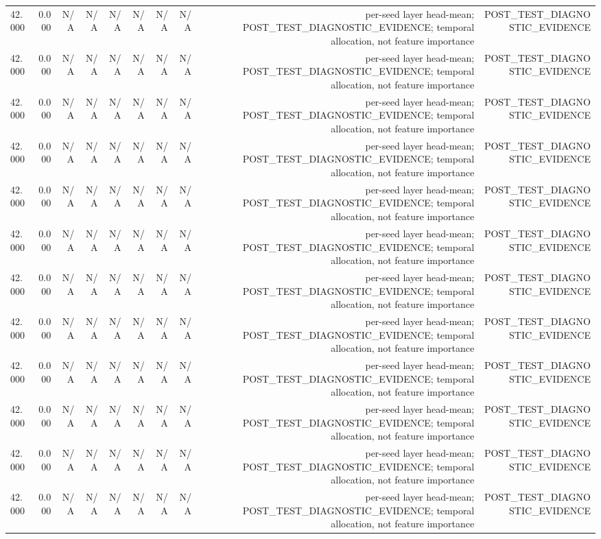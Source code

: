 \begin{table}[h!]
\begin{tabular}{lrrrrrrrrr}
42.000 & 0.000 & N/A & N/A & N/A & N/A & N/A & N/A & per-seed layer head-mean; POST\_TEST\_DIAGNOSTIC\_EVIDENCE; temporal allocation, not feature importance & POST\_TEST\_DIAGNOSTIC\_EVIDENCE \\
42.000 & 0.000 & N/A & N/A & N/A & N/A & N/A & N/A & per-seed layer head-mean; POST\_TEST\_DIAGNOSTIC\_EVIDENCE; temporal allocation, not feature importance & POST\_TEST\_DIAGNOSTIC\_EVIDENCE \\
42.000 & 0.000 & N/A & N/A & N/A & N/A & N/A & N/A & per-seed layer head-mean; POST\_TEST\_DIAGNOSTIC\_EVIDENCE; temporal allocation, not feature importance & POST\_TEST\_DIAGNOSTIC\_EVIDENCE \\
42.000 & 0.000 & N/A & N/A & N/A & N/A & N/A & N/A & per-seed layer head-mean; POST\_TEST\_DIAGNOSTIC\_EVIDENCE; temporal allocation, not feature importance & POST\_TEST\_DIAGNOSTIC\_EVIDENCE \\
42.000 & 0.000 & N/A & N/A & N/A & N/A & N/A & N/A & per-seed layer head-mean; POST\_TEST\_DIAGNOSTIC\_EVIDENCE; temporal allocation, not feature importance & POST\_TEST\_DIAGNOSTIC\_EVIDENCE \\
42.000 & 0.000 & N/A & N/A & N/A & N/A & N/A & N/A & per-seed layer head-mean; POST\_TEST\_DIAGNOSTIC\_EVIDENCE; temporal allocation, not feature importance & POST\_TEST\_DIAGNOSTIC\_EVIDENCE \\
42.000 & 0.000 & N/A & N/A & N/A & N/A & N/A & N/A & per-seed layer head-mean; POST\_TEST\_DIAGNOSTIC\_EVIDENCE; temporal allocation, not feature importance & POST\_TEST\_DIAGNOSTIC\_EVIDENCE \\
42.000 & 0.000 & N/A & N/A & N/A & N/A & N/A & N/A & per-seed layer head-mean; POST\_TEST\_DIAGNOSTIC\_EVIDENCE; temporal allocation, not feature importance & POST\_TEST\_DIAGNOSTIC\_EVIDENCE \\
42.000 & 0.000 & N/A & N/A & N/A & N/A & N/A & N/A & per-seed layer head-mean; POST\_TEST\_DIAGNOSTIC\_EVIDENCE; temporal allocation, not feature importance & POST\_TEST\_DIAGNOSTIC\_EVIDENCE \\
42.000 & 0.000 & N/A & N/A & N/A & N/A & N/A & N/A & per-seed layer head-mean; POST\_TEST\_DIAGNOSTIC\_EVIDENCE; temporal allocation, not feature importance & POST\_TEST\_DIAGNOSTIC\_EVIDENCE \\
42.000 & 0.000 & N/A & N/A & N/A & N/A & N/A & N/A & per-seed layer head-mean; POST\_TEST\_DIAGNOSTIC\_EVIDENCE; temporal allocation, not feature importance & POST\_TEST\_DIAGNOSTIC\_EVIDENCE \\
42.000 & 0.000 & N/A & N/A & N/A & N/A & N/A & N/A & per-seed layer head-mean; POST\_TEST\_DIAGNOSTIC\_EVIDENCE; temporal allocation, not feature importance & POST\_TEST\_DIAGNOSTIC\_EVIDENCE \\

\end{tabular}
\end{table}
